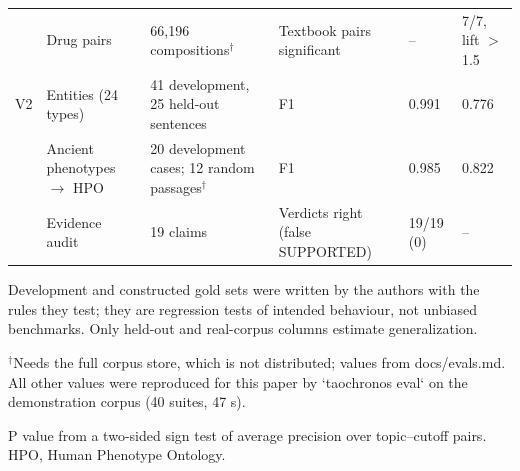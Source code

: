 \begin{table}[t]
\begin{tabular}{llllll}
 & Drug pairs & 66,196 compositions$^{\dagger}$ & Textbook pairs significant & – & 7/7, lift $>$ 1.5 \\
V2 & Entities (24 types) & 41 development, 25 held-out sentences & F1 & 0.991 & 0.776 \\
 & Ancient phenotypes $\rightarrow$ HPO & 20 development cases; 12 random passages$^{\dagger}$ & F1 & 0.985 & 0.822 \\
 & Evidence audit & 19 claims & Verdicts right (false SUPPORTED) & 19/19 (0) & – \\
\bottomrule
\end{tabular}
\par\footnotesize
Development and constructed gold sets were written by the authors with the rules they test; they are regression tests of intended behaviour, not unbiased benchmarks. Only held-out and real-corpus columns estimate generalization.\par
$^{\dagger}$Needs the full corpus store, which is not distributed; values from docs/evals.md. All other values were reproduced for this paper by `taochronos eval` on the demonstration corpus (40 suites, 47 s).\par
P value from a two-sided sign test of average precision over topic–cutoff pairs. HPO, Human Phenotype Ontology.\par
\end{table}

